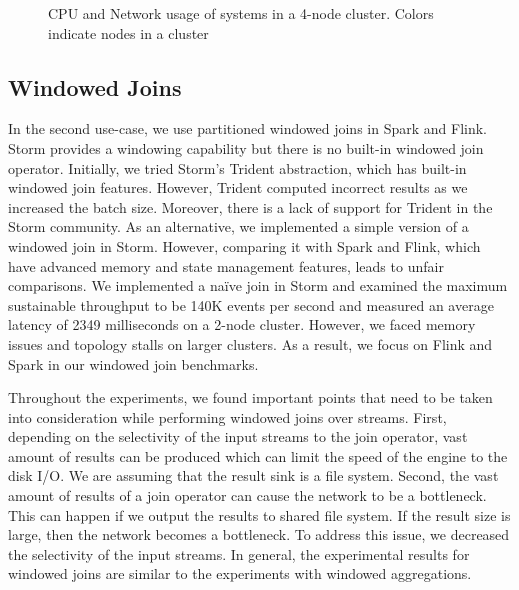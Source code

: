 {\begin{figure*}
        \caption{CPU and Network usage of systems in a 4-node cluster. Colors indicate nodes in a cluster}
        \label{fig_cpu_network_metrics}
\end{figure*}





\subsection{Windowed Joins}
In the second use-case, we use partitioned windowed joins in Spark and Flink.
  Storm provides a windowing capability but there is no built-in windowed join operator. Initially, we tried Storm's Trident abstrac\-tion, which has built-in windowed join features. However, Trident computed incorrect results as we increased the batch size. Moreover, there is a lack of support for Trident in the Storm community. As an alternative, we implemented a simple version of a windowed join in Storm. However, comparing it with Spark and Flink, which have advanced memory and state management features, leads to unfair comparisons. We implemented a na\"ive join in Storm and examined the maximum sustainable throughput to be 140K events per second and measured an average latency of 2349 milliseconds  on a 2-node cluster. However, we faced memory issues and topology stalls on larger clusters. 
As a result, we focus on Flink and Spark in our windowed join benchmarks.

Throughout the experiments, we found important points that need to be taken into consideration while performing windowed joins over streams. First, depending on the selectivity of the input streams to the join operator, vast amount of results can be produced which can limit the speed of the engine to the disk I/O. We are assuming that the result sink is a file system. Second, the vast amount of results of a join operator can cause the network to be a bottleneck. This can happen if we output the results to shared file system. If the result size is large, then the network becomes a bottleneck. To address this issue, we decreased the selectivity of the input streams.  In general, the experimental results for windowed joins are similar to the experiments with windowed aggregations. 

}
